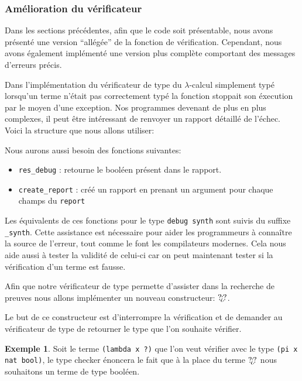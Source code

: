 \documentclass {article}
\newcommand{\codefrom}[3]
           {}
\theoremstyle{definition}
\newtheorem{example}{Exemple}
\theoremstyle{remark}
\newcommand{\fun}[1]{\lstinline!#1!}
\begin{document}
\subsubsection{Amélioration du vérificateur}
\label{upgrade_type_check}

Dans les sections précédentes, afin que le code soit présentable, nous
avons présenté une version ``allégée'' de la fonction de
vérification. Cependant, nous avons également implémenté une
version plus complète comportant des messages d'erreurs précis.

Dans l'implémentation du vérificateur de type du $\lambda$-calcul simplement typé lorsqu'un terme n'était pas
correctement typé la fonction stoppait son éxecution par le moyen d'une exception.
Nos programmes devenant de plus en plus complexes, il peut être intéressant de renvoyer un rapport détaillé
de l'échec. Voici la structure que nous allons utiliser:

\codefrom{dependent}{lambda}{debug}

Nous aurons aussi besoin des fonctions suivantes:
\begin{itemize} 
\item \fun{res_debug} : retourne le booléen présent dans le rapport.    
\item \fun{create_report} : créé un rapport en prenant un argument pour chaque champs du \fun{report}
\end{itemize}
Les équivalents de ces fonctions pour le type \fun{debug synth} sont suivis du suffixe \fun{_synth}.
Cette assistance est nécessaire pour aider les programmeurs à connaître la source de l'erreur,
tout comme le font les compilateurs modernes. Cela nous aide aussi à tester la validité de celui-ci
car on peut maintenant tester si la vérification d'un terme est fausse.

\newcommand{\Hole}{\text{?\!?`\!?}}

Afin que notre vérificateur de type permette d'assister dans la recherche de preuves
nous allons implémenter un nouveau constructeur: $\Hole$.

Le but de ce constructeur est d'interrompre la vérification et de demander au vérificateur de type de
retourner le type que l'on souhaite vérifier.
\begin{example}
  Soit le terme \fun{(lambda x ?)} que l'on veut vérifier avec le type \fun{(pi x nat bool)},
  le type checker énoncera le fait que à la place du terme $\Hole$ nous souhaitons un terme de type 
  booléen.
\end{example}
\end{document}
